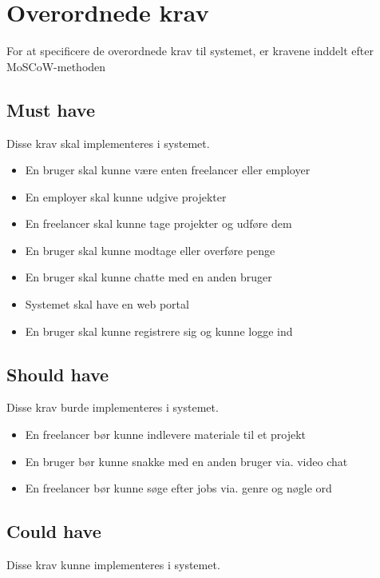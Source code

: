 \chapter{Overordnede krav}

For at specificere de overordnede krav til systemet, er kravene inddelt efter MoSCoW-methoden %

\section{Must have}

Disse krav skal implementeres i systemet.

\begin{itemize}
    \item En bruger skal kunne være enten freelancer eller employer
    \item En employer skal kunne udgive projekter
    \item En freelancer skal kunne tage projekter og udføre dem
    \item En bruger skal kunne modtage eller overføre penge
    \item En bruger skal kunne chatte med en anden bruger
    \item Systemet skal have en web portal
    \item En bruger skal kunne registrere sig og kunne logge ind
\end{itemize}

\section{Should have}

Disse krav burde implementeres i systemet.

\begin{itemize}
    \item En freelancer bør kunne indlevere materiale til et projekt
    \item En bruger bør kunne snakke med en anden bruger via. video chat
    \item En freelancer bør kunne søge efter jobs via. genre og nøgle ord
\end{itemize}

\section{Could have}

Disse krav kunne implementeres i systemet.

